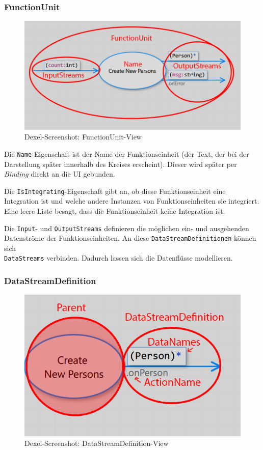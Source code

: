 	\subsubsection{FunctionUnit}
	
\begin{figure}[H]
	\centering
	\includegraphics[width=0.9\linewidth]{./img/FunctionUnitView.png} 
	\caption{Dexel-Screenshot: FunctionUnit-View}
\end{figure}

Die \texttt{Name}-Eigenschaft ist der Name der Funktionseinheit (der Text, der bei der
Darstellung später innerhalb des Kreises erscheint). Dieser wird später per \textit{Binding}
direkt an die UI gebunden. 

Die \texttt{IsIntegrating}-Eigenschaft gibt an, ob diese Funktionseinheit eine Integration
ist und welche andere Instanzen von Funktionseinheiten sie integriert.
Eine leere Liste besagt, dass die Funktionseinheit keine Integration ist.

Die \texttt{Input}- und \texttt{OutputStreams} definieren die möglichen ein- und ausgehenden
Datenströme der Funktionseinheiten. An diese \texttt{DataStreamDefinitionen} können sich \\\texttt{DataStreams}
verbinden. Dadurch lassen sich die Datenflüsse modellieren.


	\subsubsection{DataStreamDefinition}

	
		
		\begin{figure}[H]
			\centering
			\includegraphics[width=0.6\linewidth]{./img/DataStreamDefinitionView.png} 
			\caption{Dexel-Screenshot: DataStreamDefinition-View}
		\end{figure}
	
